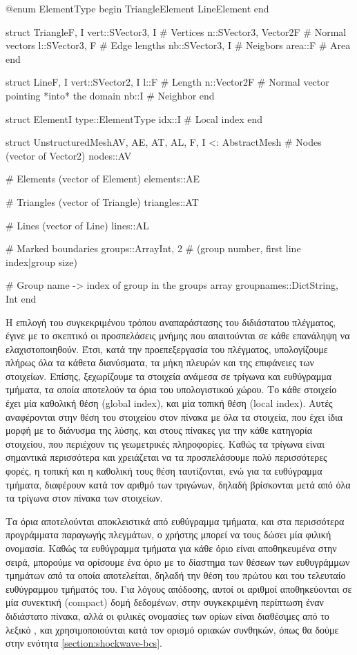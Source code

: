 {\large
\begin{jllisting}[language=julia,style=jlcodestyle]
@enum ElementType begin
    TriangleElement
    LineElement
end

struct Triangle{F, I}
    vert::SVector{3, I} # Vertices
    n::SVector{3, Vector2{F}} # Normal vectors
    l::SVector{3, F} # Edge lengths
    nb::SVector{3, I} # Neigbors
    area::F # Area
end

struct Line{F, I}
    vert::SVector{2, I}
    l::F # Length
    n::Vector2{F} # Normal vector pointing *into* the domain
    nb::I # Neighbor
end

struct Element{I}
    type::ElementType
    idx::I # Local index
end

struct UnstructuredMesh{AV, AE, AT, AL, F, I} <: AbstractMesh
    # Nodes (vector of Vector2)
    nodes::AV

    # Elements (vector of Element)
    elements::AE

    # Triangles (vector of Triangle)
    triangles::AT

    # Lines (vector of Line)
    lines::AL

    # Marked boundaries
    groups::Array{Int, 2} # (group number, first line index|group size)

    # Group name -> index of group in the groups array
    groupnames::Dict{String, Int}
end
\end{jllisting}
}

Η επιλογή του συγκεκριμένου τρόπου αναπαράστασης του διδιάστατου πλέγματος, έγινε με το σκεπτικό οι προσπελάσεις μνήμης που απαιτούνται σε κάθε επανάληψη να ελαχιστοποιηθούν.
Έτσι, κατά την προεπεξεργασία του πλέγματος, υπολογίζουμε πλήρως όλα τα κάθετα διανύσματα, τα μήκη πλευρών και της επιφάνειες των στοιχείων.
Επίσης, ξεχωρίζουμε τα στοιχεία ανάμεσα σε τρίγωνα και ευθύγραμμα τμήματα, τα οποία αποτελούν τα όρια του υπολογιστικού χώρου.
Το κάθε στοιχείο έχει μία καθολική θέση (global index), και μία τοπική θέση (local index).
Αυτές αναφέρονται στην θέση του στοιχείου στον πίνακα με όλα τα στοιχεία, που έχει ίδια μορφή με το διάνυσμα της λύσης, και στους πίνακες για την κάθε κατηγορία στοιχείου, που περιέχουν τις γεωμετρικές πληροφορίες.
Καθώς τα τρίγωνα είναι σημαντικά περισσότερα και χρειάζεται να τα προσπελάσουμε πολύ περισσότερες φορές, η τοπική και η καθολική τους θέση ταυτίζονται, ενώ για τα ευθύγραμμα τμήματα, διαφέρουν κατά τον αριθμό των τριγώνων, δηλαδή βρίσκονται μετά από όλα τα τρίγωνα στον πίνακα των στοιχείων.

Τα όρια αποτελούνται αποκλειστικά από ευθύγραμμα τμήματα, και στα περισσότερα προγράμματα παραγωγής πλεγμάτων, ο χρήστης μπορεί να τους δώσει μία φιλική ονομασία.
Καθώς τα ευθύγραμμα τμήματα για κάθε όριο είναι αποθηκευμένα στην σειρά, μπορούμε να ορίσουμε ένα όριο με το δίαστημα των θέσεων των ευθυγράμμων τμημάτων από τα οποία αποτελείται, δηλαδή την θέση του πρώτου και του τελευταίο ευθύγραμμου τμήματός του.
Για λόγους απόδοσης, αυτοί οι αριθμοί αποθηκεύονται σε μία συνεκτική (compact) δομή δεδομένων, στην συγκεκριμένη περίπτωση έναν διδιάστατο πίνακα, αλλά οι φιλικές ονομασίες των ορίων είναι διαθέσιμες από το λεξικό , και χρησιμοποιούνται κατά τον ορισμό οριακών συνθηκών, όπως θα δούμε στην ενότητα \ref{section:shockwave-bcs}.


